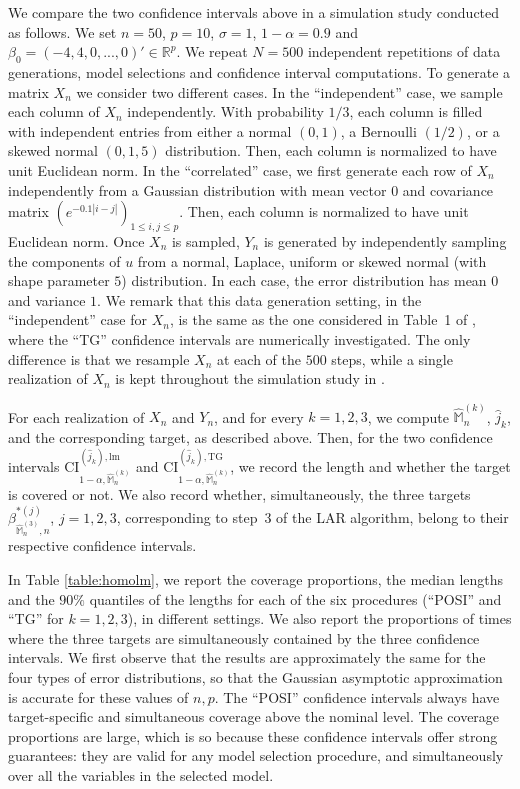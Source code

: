 \documentclass[preprint]{imsart}
\newcommand{\R}{{\mathbb R}}
\newcommand{\M}{\mathbb M}
\numberwithin{equation}{section}
\begin{document}
We compare the two confidence intervals above in a simulation study conducted as follows. We set $n=50$, $p=10$, $\sigma=1$, $1-\alpha=0.9$ and $\beta_0 = (-4,4,0,...,0)'\in\R^p$. We repeat $N = 500$ independent repetitions of data generations, model selections and confidence interval computations. To generate a matrix $X_n$ we consider two different cases. In the ``independent'' case, we sample each column of $X_n$ independently. With probability $1/3$, each column is filled with independent entries from either a normal $(0,1)$, a Bernoulli $(1/2)$, or a skewed normal $(0,1,5)$ distribution. Then, each column is normalized to have unit Euclidean norm. In the  ``correlated'' case, we first generate each row of $X_n$ independently from a Gaussian distribution with mean vector $0$ and covariance matrix $( e^{-0.1 |i-j|} )_{1 \leq i,j \leq p}$. Then, each column is normalized to have unit Euclidean norm.
Once $X_n$ is sampled, $Y_n$ is generated by independently sampling the components of $u$ from a normal, Laplace, uniform or skewed normal (with shape parameter $5$) distribution. In each case, the error distribution has mean $0$ and variance $1$. We remark that this data generation setting, in the ``independent'' case for $X_n$, is the same as the one considered in Table~1 of \cite{Tib15a}, where the ``TG'' confidence intervals are numerically investigated. The only difference is that we resample $X_n$ at each of the $500$ steps, while a single realization of $X_n$ is kept throughout the simulation study in \cite{Tib15a}.

For each realization of $X_n$ and $Y_n$, and for every $k=1,2,3$, we compute $\hat{\M}_n^{(k)}$, $\hat{j}_k$, and the corresponding target, as described above. Then, for the two confidence intervals
$\mathrm{CI}_{1-\alpha, \hat{\mathbb{M}}_n^{(k)}}^{(\hat{j}_k), \mathrm{lm}}$ and $\mathrm{CI}_{1-\alpha, \hat{\mathbb{M}}_n^{(k)}}^{(\hat{j}_k), \mathrm{TG}}$, we record the length and whether the target is covered or not.
We also record whether, simultaneously, the three targets $\beta_{\hat{\mathbb{M}}_n^{(3)},n}^{*(j)}$, $j=1,2,3$, corresponding to step~3 of the LAR algorithm, belong to their respective confidence intervals.

In Table \ref{table:homolm}, we report the coverage proportions, the median lengths and the $90 \%$ quantiles of the lengths for each of the six procedures (``POSI'' and ``TG'' for $k=1,2,3$), in different settings. We also report the proportions of times where the three targets are simultaneously contained by the three confidence intervals. We first observe that the results are approximately the same for the four types of error distributions, so that the Gaussian asymptotic approximation is accurate for these values of $n,p$. The ``POSI'' confidence intervals always have target-specific and simultaneous coverage above the nominal level. The coverage proportions are large, which is so because these confidence intervals offer strong guarantees: they are valid for any model selection procedure, and simultaneously over all the variables in the selected model. 
\end{document}
